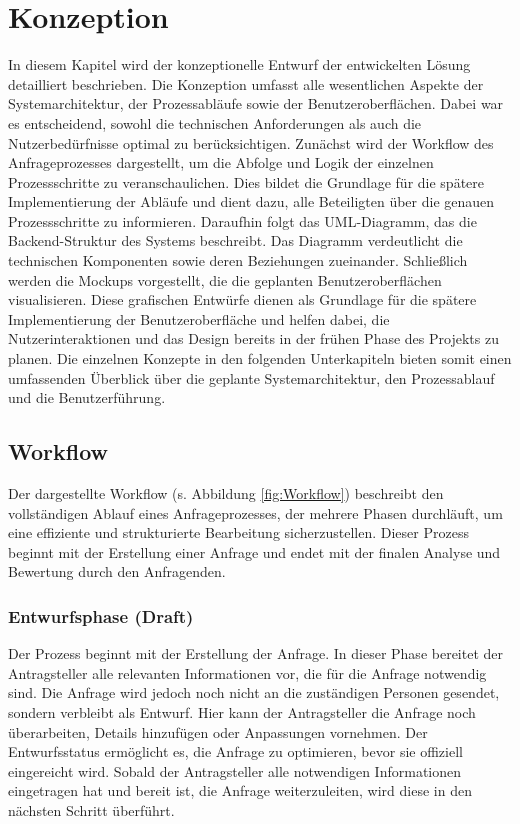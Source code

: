 \chapter{Konzeption}
In diesem Kapitel wird der konzeptionelle Entwurf der entwickelten Lösung detailliert beschrieben. Die Konzeption umfasst alle wesentlichen Aspekte der Systemarchitektur, der Prozessabläufe sowie der Benutzeroberflächen. Dabei war es entscheidend, sowohl die technischen Anforderungen als auch die Nutzerbedürfnisse optimal zu berücksichtigen.
\newline
Zunächst wird der Workflow des Anfrageprozesses dargestellt, um die Abfolge und Logik der einzelnen Prozessschritte zu veranschaulichen. Dies bildet die Grundlage für die spätere Implementierung der Abläufe und dient dazu, alle Beteiligten über die genauen Prozessschritte zu informieren.
\newline
Daraufhin folgt das UML-Diagramm, das die Backend-Struktur des Systems beschreibt. Das Diagramm verdeutlicht die technischen Komponenten sowie deren Beziehungen zueinander.
\newline
Schließlich werden die Mockups vorgestellt, die die geplanten Benutzeroberflächen visualisieren. Diese grafischen Entwürfe dienen als Grundlage für die spätere Implementierung der Benutzeroberfläche und helfen dabei, die Nutzerinteraktionen und das Design bereits in der frühen Phase des Projekts zu planen.
\newline
Die einzelnen Konzepte in den folgenden Unterkapiteln bieten somit einen umfassenden Überblick über die geplante Systemarchitektur, den Prozessablauf und die Benutzerführung.
\newpage
\section{Workflow}
Der dargestellte Workflow (s. Abbildung \ref{fig:Workflow}) beschreibt den vollständigen Ablauf eines Anfrageprozesses, der mehrere Phasen durchläuft, um eine effiziente und strukturierte Bearbeitung sicherzustellen. Dieser Prozess beginnt mit der Erstellung einer Anfrage und endet mit der finalen Analyse und Bewertung durch den Anfragenden.
\subsection*{Entwurfsphase (Draft)}
Der Prozess beginnt mit der Erstellung der Anfrage. In dieser Phase bereitet der Antragsteller alle relevanten Informationen vor, die für die Anfrage notwendig sind. Die Anfrage wird jedoch noch nicht an die zuständigen Personen gesendet, sondern verbleibt als Entwurf. Hier kann der Antragsteller die Anfrage noch überarbeiten, Details hinzufügen oder Anpassungen vornehmen. Der Entwurfsstatus ermöglicht es, die Anfrage zu optimieren, bevor sie offiziell eingereicht wird. Sobald der Antragsteller alle notwendigen Informationen eingetragen hat und bereit ist, die Anfrage weiterzuleiten, wird diese in den nächsten Schritt überführt.
